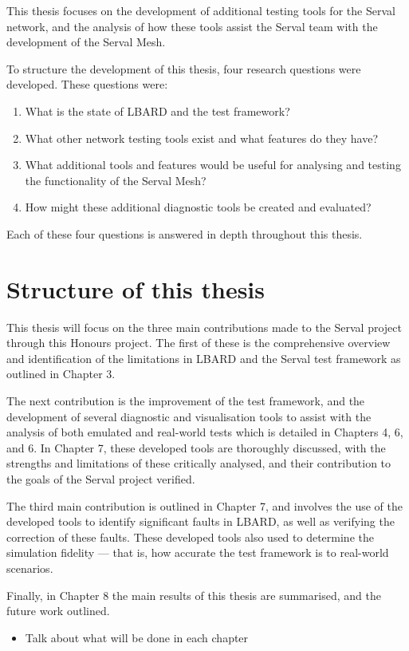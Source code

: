 This thesis focuses on the development of additional testing tools for the Serval network, and the analysis of how these tools assist the Serval team with the development of the Serval Mesh.


To structure the development of this thesis, four research questions were developed.
These questions were:
\begin{enumerate}
    \item What is the state of LBARD and the test framework?
    \item What other network testing tools exist and what features do they have?
    \item What additional tools and features would be useful for analysing and testing the functionality of the Serval Mesh?
    \item How might these additional diagnostic tools be created and evaluated?
\end{enumerate}
Each of these four questions is answered in depth throughout this thesis.


\section{Structure of this thesis}

This thesis will focus on the three main contributions made to the Serval project through this Honours project.
The first of these is the comprehensive overview and identification of the limitations in LBARD and the Serval test framework as outlined in Chapter 3.

The next contribution is the improvement of the test framework, and the development of several diagnostic and visualisation tools to assist with the analysis of both emulated and real-world tests which is detailed in Chapters 4, 6, and 6. 
In Chapter 7, these developed tools are thoroughly discussed, with the strengths and limitations of these critically analysed, and their contribution to the goals of the Serval project verified. 

The third main contribution is outlined in Chapter 7, and involves the use of the developed tools to identify significant faults in LBARD, as well as verifying the correction of these faults.
These developed tools also used to determine the simulation fidelity — that is, how accurate the test framework is to real-world scenarios.

Finally, in Chapter 8 the main results of this thesis are summarised, and the future work outlined.


\begin{itemize}
    \item   Talk about what will be done in each chapter
\end{itemize}

